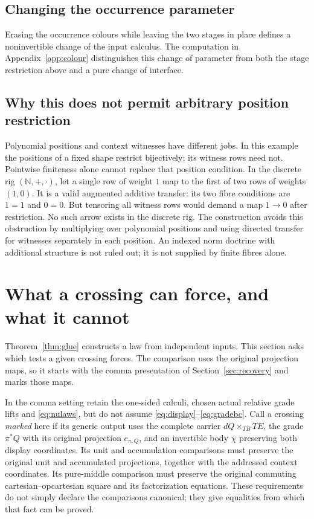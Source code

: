 \documentclass[11pt]{article}
\numberwithin{equation}{section}
\theoremstyle{definition}\newtheorem{definition}[theorem]{Definition}
\begin{document}
\subsection{Changing the occurrence parameter}
Erasing the occurrence colours while leaving the two stages in place
defines a noninvertible change of the input calculus. The computation
in Appendix~\ref{app:colour} distinguishes this change of parameter
from both the stage restriction above and a pure change of interface.

\subsection{Why this does not permit arbitrary position restriction}
Polynomial positions and context witnesses have different jobs. In this
example the positions of a fixed shape restrict bijectively; its witness
rows need not. Pointwise finiteness alone cannot replace that position
condition. In the discrete rig $(\mathbb N,+,\cdot)$, let a single row
of weight $1$ map to the first of two rows of weights $(1,0)$. It is a
valid augmented additive transfer: its two fibre conditions are $1=1$
and $0=0$. But tensoring all witness rows would demand a map $1\to0$
after restriction. No such arrow exists in the discrete rig.
The construction avoids this obstruction by multiplying over polynomial
positions and using directed transfer for witnesses separately in each
position. An indexed norm doctrine with additional structure is not ruled
out; it is not supplied by finite fibres alone.

\section{What a crossing can force, and what it cannot}\label{sec:recognition}\label{app:recognition}
Theorem~\ref{thm:glue} constructs a law from independent inputs.
This section asks which tests a given crossing forces. The comparison
uses the original projection maps, so it starts with the comma
presentation of Section~\ref{sec:recovery} and marks those maps.

In the comma setting retain the one-sided calculi, chosen actual relative
grade lifts and \eqref{eq:nulaws}, but do not assume
\eqref{eq:display}--\eqref{eq:gradebc}. Call a crossing \emph{marked} here
if its generic output uses the complete carrier $dQ\times_{TB}TE$, the
grade $\pi^*Q$ with its original projection $c_{\pi,Q}$, and an invertible
body $\chi$ preserving both display coordinates. Its unit and accumulation
comparisons must preserve the original unit and accumulated
projections, together with the addressed context coordinates. Its
pure-middle comparison must preserve the original commuting
cartesian--opcartesian square and its factorization equations. These
requirements do not simply declare the comparisons canonical; they give
equalities from which that fact can be proved.
\end{document}

